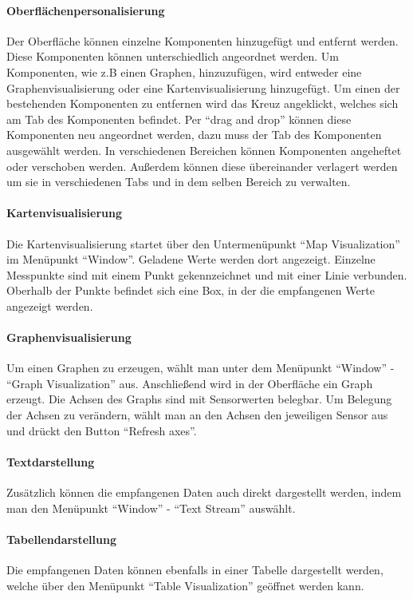 \paragraph{Oberflächenpersonalisierung}
Der Oberfläche können einzelne Komponenten hinzugefügt und entfernt werden. Diese Komponenten können unterschiedlich angeordnet werden. Um Komponenten, wie z.B einen Graphen, hinzuzufügen, wird entweder eine Graphenvisualisierung oder eine Kartenvisualisierung hinzugefügt. Um einen der bestehenden Komponenten zu entfernen wird das Kreuz angeklickt, welches sich am Tab des Komponenten befindet. Per ``drag and drop''  können diese Komponenten neu angeordnet werden, dazu muss der Tab des Komponenten ausgewählt werden. In verschiedenen Bereichen können Komponenten angeheftet oder verschoben werden. Außerdem können diese übereinander verlagert werden um sie in verschiedenen Tabs und in dem selben Bereich zu verwalten.
\paragraph{Kartenvisualisierung}
Die Kartenvisualisierung startet über den Untermenüpunkt ``Map Visualization'' im Menüpunkt ``Window''. Geladene Werte werden dort angezeigt. Einzelne Messpunkte sind mit einem Punkt gekennzeichnet und mit einer Linie verbunden. Oberhalb der Punkte befindet sich eine Box, in der die empfangenen Werte angezeigt werden.
\paragraph{Graphenvisualisierung}
Um einen Graphen zu erzeugen, wählt man unter dem Menüpunkt ``Window'' - ``Graph Visualization'' aus. Anschließend wird in der Oberfläche ein Graph erzeugt. Die Achsen des Graphs sind mit Sensorwerten belegbar. Um Belegung der Achsen zu verändern, wählt man an den Achsen den jeweiligen Sensor aus und drückt den Button ``Refresh axes''.

\paragraph{Textdarstellung}
Zusätzlich können die empfangenen Daten auch direkt dargestellt werden, indem man den Menüpunkt ``Window'' - ``Text Stream'' auswählt.

\paragraph {Tabellendarstellung}
Die empfangenen Daten können ebenfalls in einer Tabelle dargestellt werden, welche über den Menüpunkt ``Table Visualization'' geöffnet werden kann.

